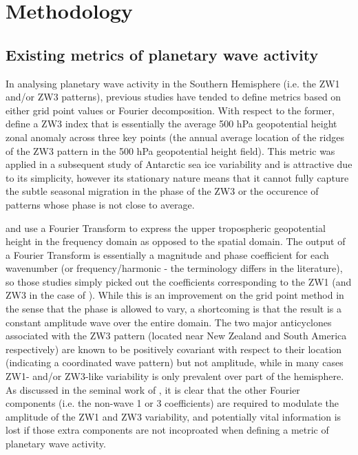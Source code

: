 \section{Methodology}\label{s:methodology}

\subsection{Existing metrics of planetary wave activity}\label{s:existing_metrics}

In analysing planetary wave activity in the Southern Hemisphere (i.e. the ZW1 and/or ZW3 patterns), previous studies have tended to define metrics based on either grid point values or Fourier decomposition. With respect to the former, \citet{Raphael2004} define a ZW3 index that is essentially the average 500 hPa geopotential height zonal anomaly across three key points (the annual average location of the ridges of the ZW3 pattern in the 500 hPa geopotential height field). This metric was applied in a subsequent study of Antarctic sea ice variability \citep{Raphael2007} and is attractive due to its simplicity, however its stationary nature means that it cannot fully capture the subtle \citep[but not insignificant at around 15 degrees of longitude on average;][]{vanLoon1984,Mo1985} seasonal migration in the phase of the ZW3 or the occurence of patterns whose phase is not close to average.

\citet{Hobbs2007} and \citet{Hobbs2010} use a Fourier Transform to express the upper tropospheric geopotential height in the frequency domain as opposed to the spatial domain. The output of a Fourier Transform is essentially a magnitude and phase coefficient for each wavenumber (or frequency/harmonic - the terminology differs in the literature), so those studies simply picked out the coefficients corresponding to the ZW1 (and ZW3 in the case of \citet{Hobbs2010}). While this is an improvement on the grid point method in the sense that the phase is allowed to vary, a shortcoming is that the result is a constant amplitude wave over the entire domain. The two major anticyclones associated with the ZW3 pattern (located near New Zealand and South America respectively) are known \citep{Hobbs2010} to be positively covariant with respect to their location (indicating a coordinated wave pattern) but not amplitude, while in many cases ZW1- and/or ZW3-like variability is only prevalent over part of the hemisphere. As discussed in the seminal work of \citet{vanLoon1972}, it is clear that the other Fourier components (i.e. the non-wave 1 or 3 coefficients) are required to modulate the amplitude of the ZW1 and ZW3 variability, and potentially vital information is lost if those extra components are not incoproated when defining a metric of planetary wave activity. 

